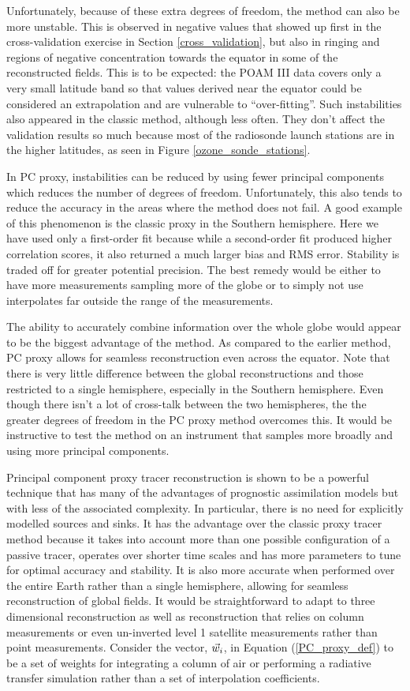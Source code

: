 Unfortunately, because of these extra degrees of freedom, the method can also
be more unstable.
This is observed in negative values that showed up first in the cross-validation
exercise in Section \ref{cross_validation}, but also in ringing and regions
of negative concentration towards the equator in some of the reconstructed
fields.
This is to be expected: the POAM III data covers only a very small latitude 
band so that values derived near the equator could be considered an
extrapolation and are vulnerable to ``over-fitting''.
Such instabilities also appeared in the classic method, although less often.
They don't affect the validation results so much because most of the 
radiosonde launch stations are in the higher latitudes, as seen in
Figure \ref{ozone_sonde_stations}.

In PC proxy, instabilities can be reduced by using fewer principal components
which reduces the number of degrees of freedom.
Unfortunately, this also tends to reduce the accuracy in the areas where the
method does not fail.
A good example of this phenomenon is the classic proxy in the Southern
hemisphere. Here we have used only a first-order fit because while a 
second-order fit produced higher correlation scores, it also returned a
much larger bias and RMS error.
Stability is traded off for greater potential precision.
The best remedy would be either to have more measurements sampling more of
the globe or to simply not use interpolates far outside the range of the
measurements.

The ability to accurately combine information over the whole globe
would appear to be the biggest advantage of the method.
As compared to the earlier method, PC proxy
allows for seamless reconstruction even across the equator.
Note that there is very little difference between the global reconstructions
and those restricted to a single hemisphere, especially in the Southern
hemisphere.
Even though there isn't a lot of cross-talk between the two hemispheres, the
the greater degrees of freedom in the PC proxy method overcomes this.
It would be instructive to test the method on an instrument that samples
more broadly and using more principal components.

Principal component proxy tracer reconstruction is shown to be a powerful
technique that 
has many of the advantages of prognostic assimilation models but with
less of the associated complexity.
In particular, there is no need for explicitly modelled sources and sinks.
It has the advantage over the classic proxy tracer method because it takes
into account more than one possible configuration of a passive tracer, operates over
shorter time scales and has more parameters to tune for optimal accuracy
and stability.
It is also more accurate when performed over the entire Earth rather than
a single hemisphere, allowing for seamless reconstruction of global fields.
It would be straightforward to adapt to three dimensional reconstruction 
as well as reconstruction that relies on column measurements or even un-inverted
level 1 satellite measurements rather than point measurements.
Consider the vector, $\vec w_i$, in Equation (\ref{PC_proxy_def})
to be a set of weights for integrating a column of air or performing
a radiative transfer simulation rather than a set of interpolation
coefficients.

